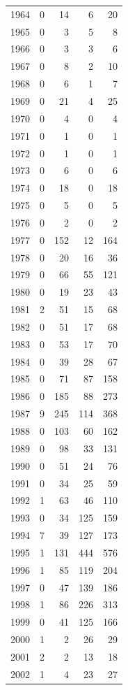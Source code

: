 \documentclass[
]{article}
\begin{document}
\begin{longtable}{rrrrr}
1964 & 0 & 14 & 6 & 20 \\ 
1965 & 0 & 3 & 5 & 8 \\ 
1966 & 0 & 3 & 3 & 6 \\ 
1967 & 0 & 8 & 2 & 10 \\ 
1968 & 0 & 6 & 1 & 7 \\ 
1969 & 0 & 21 & 4 & 25 \\ 
1970 & 0 & 4 & 0 & 4 \\ 
1971 & 0 & 1 & 0 & 1 \\ 
1972 & 0 & 1 & 0 & 1 \\ 
1973 & 0 & 6 & 0 & 6 \\ 
1974 & 0 & 18 & 0 & 18 \\ 
1975 & 0 & 5 & 0 & 5 \\ 
1976 & 0 & 2 & 0 & 2 \\ 
1977 & 0 & 152 & 12 & 164 \\ 
1978 & 0 & 20 & 16 & 36 \\ 
1979 & 0 & 66 & 55 & 121 \\ 
1980 & 0 & 19 & 23 & 43 \\ 
1981 & 2 & 51 & 15 & 68 \\ 
1982 & 0 & 51 & 17 & 68 \\ 
1983 & 0 & 53 & 17 & 70 \\ 
1984 & 0 & 39 & 28 & 67 \\ 
1985 & 0 & 71 & 87 & 158 \\ 
1986 & 0 & 185 & 88 & 273 \\ 
1987 & 9 & 245 & 114 & 368 \\ 
1988 & 0 & 103 & 60 & 162 \\ 
1989 & 0 & 98 & 33 & 131 \\ 
1990 & 0 & 51 & 24 & 76 \\ 
1991 & 0 & 34 & 25 & 59 \\ 
1992 & 1 & 63 & 46 & 110 \\ 
1993 & 0 & 34 & 125 & 159 \\ 
1994 & 7 & 39 & 127 & 173 \\ 
1995 & 1 & 131 & 444 & 576 \\ 
1996 & 1 & 85 & 119 & 204 \\ 
1997 & 0 & 47 & 139 & 186 \\ 
1998 & 1 & 86 & 226 & 313 \\ 
1999 & 0 & 41 & 125 & 166 \\ 
2000 & 1 & 2 & 26 & 29 \\ 
2001 & 2 & 2 & 13 & 18 \\ 
2002 & 1 & 4 & 23 & 27 \\ 

\end{longtable}
\end{document}
